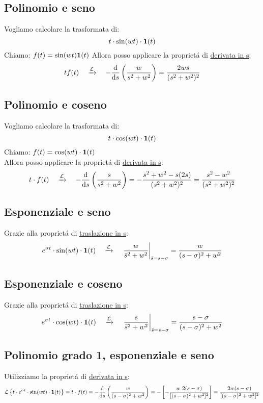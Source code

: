 \documentclass[../main.tex]{subfiles}
\begin{document}
	\subsection{Polinomio e seno}
		\label{sec:trasf_t_seno}
		Vogliamo calcolare la trasformata di:
		\[
			t \cdot \sin(wt) \cdot \textbf{1}(t)
		\]
		Chiamo: $ f(t) = \sin(wt)\textbf{1}(t) $
		Allora posso applicare la propriet\'{a} di \hyperref[sec:deriv_s]{derivata in s}:
		\[
			t f(t) \quad \xrightarrow{\mathcal{L}} \quad -\frac{\mathrm{d} }{\mathrm{d} s}\left( \frac{w}{s^2+w^2}\right) = \frac{2ws}{(s^2+w^2)^2}
		\]

	\subsection{Polinomio e coseno}
		\label{sec:trasf_t_coseno}
		Vogliamo calcolare la trasformata di: 
		\[
			t \cdot \cos(wt) \cdot \textbf{1}(t)
		\]
		Chiamo: $ f(t) = \cos(wt) \cdot \textbf{1}(t) $\\
		Allora posso applicare la propriet\'{a} di \hyperref[sec:deriv_s]{derivata in s}:
		\[
			t \cdot f(t) \quad \xrightarrow{\mathcal{L}} \quad -\frac{\mathrm{d} }{\mathrm{d} s}\left( \frac{s}{s^2+w^2}\right) = -\frac{s^2+w^2-s(2s)}{(s^2+w^2)^2} = \frac{s^2-w^2}{(s^2+w^2)^2}
		\]

	\subsection{Esponenziale e seno}
		Grazie alla propriet\'{a} di \hyperref[sec:trasl_s]{traslazione in s}:
		\[
			e^{\sigma t} \cdot \sin(wt) \cdot \textbf{1}(t) \quad \xrightarrow{\mathcal{L}} \quad  \left. \frac{w}{\bar{s}^2+w^2} \right|_{\bar{s}=s-\sigma} = \frac{w}{(s-\sigma)^2 + w^2}
		\]

	\subsection{Esponenziale e coseno}
		Grazie alla propriet\'{a} di \hyperref[sec:trasl_s]{traslazione in s}:
		\[
			e^{\sigma t} \cdot \cos(wt) \cdot \textbf{1}(t) \quad \xrightarrow{\mathcal{L}} \quad  \left. \frac{\bar{s}}{\bar{s}^2+w^2} \right|_{\bar{s}=s-\sigma} = \frac{s-\sigma}{(s-\sigma)^2 + w^2}
		\]

	\subsection{Polinomio grado 1, esponenziale e seno}
		Utilizziamo la propriet\'{a} di \hyperref[sec:deriv_s]{derivata in s}:
		\[
			\mathcal{L} \left\lbrace t \cdot e^{\sigma t} \cdot \sin(wt) \cdot \textbf{1}(t) \right\rbrace = t \cdot f(t) = -\frac{\mathrm{d} }{\mathrm{d} s} \left( \frac{w}{(s-\sigma)^2+w^2} \right) = - \left[ -\frac{w\ 2(s-\sigma)}{[(s-\sigma)^2+w^2]^2} \right] = \frac{2w(s-\sigma)}{[(s-\sigma)^2+w^2]^2}
		\]
\end{document}
